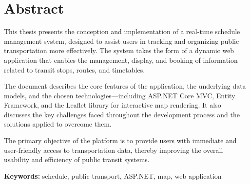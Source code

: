 \section*{Abstract}


This thesis presents the conception and implementation of a real-time schedule management system, designed to assist users in tracking and organizing public transportation more effectively. The system takes the form of a dynamic web application that enables the management, display, and booking of information related to transit stops, routes, and timetables.

The document describes the core features of the application, the underlying data models, and the chosen technologies—including ASP.NET Core MVC, Entity Framework, and the Leaflet library for interactive map rendering. It also discusses the key challenges faced throughout the development process and the solutions applied to overcome them.

The primary objective of the platform is to provide users with immediate and user-friendly access to transportation data, thereby improving the overall usability and efficiency of public transit systems.


\vspace{1cm}

\noindent\textbf{Keywords:} schedule, public transport, ASP.NET, map, web application
